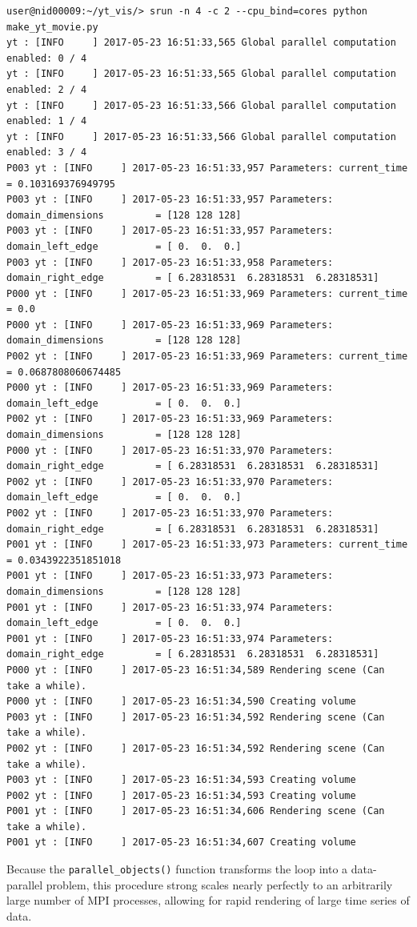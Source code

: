 \begin{itemize}
\begin{lstlisting}[breaklines=true]
user@nid00009:~/yt_vis/> srun -n 4 -c 2 --cpu_bind=cores python make_yt_movie.py
yt : [INFO     ] 2017-05-23 16:51:33,565 Global parallel computation enabled: 0 / 4
yt : [INFO     ] 2017-05-23 16:51:33,565 Global parallel computation enabled: 2 / 4
yt : [INFO     ] 2017-05-23 16:51:33,566 Global parallel computation enabled: 1 / 4
yt : [INFO     ] 2017-05-23 16:51:33,566 Global parallel computation enabled: 3 / 4
P003 yt : [INFO     ] 2017-05-23 16:51:33,957 Parameters: current_time              = 0.103169376949795
P003 yt : [INFO     ] 2017-05-23 16:51:33,957 Parameters: domain_dimensions         = [128 128 128]
P003 yt : [INFO     ] 2017-05-23 16:51:33,957 Parameters: domain_left_edge          = [ 0.  0.  0.]
P003 yt : [INFO     ] 2017-05-23 16:51:33,958 Parameters: domain_right_edge         = [ 6.28318531  6.28318531  6.28318531]
P000 yt : [INFO     ] 2017-05-23 16:51:33,969 Parameters: current_time              = 0.0
P000 yt : [INFO     ] 2017-05-23 16:51:33,969 Parameters: domain_dimensions         = [128 128 128]
P002 yt : [INFO     ] 2017-05-23 16:51:33,969 Parameters: current_time              = 0.0687808060674485
P000 yt : [INFO     ] 2017-05-23 16:51:33,969 Parameters: domain_left_edge          = [ 0.  0.  0.]
P002 yt : [INFO     ] 2017-05-23 16:51:33,969 Parameters: domain_dimensions         = [128 128 128]
P000 yt : [INFO     ] 2017-05-23 16:51:33,970 Parameters: domain_right_edge         = [ 6.28318531  6.28318531  6.28318531]
P002 yt : [INFO     ] 2017-05-23 16:51:33,970 Parameters: domain_left_edge          = [ 0.  0.  0.]
P002 yt : [INFO     ] 2017-05-23 16:51:33,970 Parameters: domain_right_edge         = [ 6.28318531  6.28318531  6.28318531]
P001 yt : [INFO     ] 2017-05-23 16:51:33,973 Parameters: current_time              = 0.0343922351851018
P001 yt : [INFO     ] 2017-05-23 16:51:33,973 Parameters: domain_dimensions         = [128 128 128]
P001 yt : [INFO     ] 2017-05-23 16:51:33,974 Parameters: domain_left_edge          = [ 0.  0.  0.]
P001 yt : [INFO     ] 2017-05-23 16:51:33,974 Parameters: domain_right_edge         = [ 6.28318531  6.28318531  6.28318531]
P000 yt : [INFO     ] 2017-05-23 16:51:34,589 Rendering scene (Can take a while).
P000 yt : [INFO     ] 2017-05-23 16:51:34,590 Creating volume
P003 yt : [INFO     ] 2017-05-23 16:51:34,592 Rendering scene (Can take a while).
P002 yt : [INFO     ] 2017-05-23 16:51:34,592 Rendering scene (Can take a while).
P003 yt : [INFO     ] 2017-05-23 16:51:34,593 Creating volume
P002 yt : [INFO     ] 2017-05-23 16:51:34,593 Creating volume
P001 yt : [INFO     ] 2017-05-23 16:51:34,606 Rendering scene (Can take a while).
P001 yt : [INFO     ] 2017-05-23 16:51:34,607 Creating volume
\end{lstlisting}

Because the \texttt{parallel\_objects()} function transforms the loop into a
data-parallel problem, this procedure strong scales nearly perfectly to an
arbitrarily large number of MPI processes, allowing for rapid rendering of
large time series of data.

\end{itemize}
